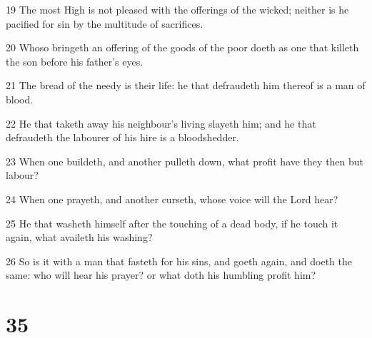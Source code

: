 \par 19 The most High is not pleased with the offerings of the wicked; neither is he pacified for sin by the multitude of sacrifices.
\par 20 Whoso bringeth an offering of the goods of the poor doeth as one that killeth the son before his father's eyes.
\par 21 The bread of the needy is their life: he that defraudeth him thereof is a man of blood.
\par 22 He that taketh away his neighbour's living slayeth him; and he that defraudeth the labourer of his hire is a bloodshedder.
\par 23 When one buildeth, and another pulleth down, what profit have they then but labour?
\par 24 When one prayeth, and another curseth, whose voice will the Lord hear?
\par 25 He that washeth himself after the touching of a dead body, if he touch it again, what availeth his washing?
\par 26 So is it with a man that fasteth for his sins, and goeth again, and doeth the same: who will hear his prayer? or what doth his humbling profit him?

\chapter{35}

